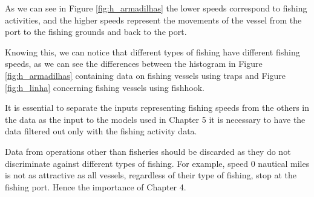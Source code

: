 As we can see in Figure \ref{fig:h_armadilhas} the lower speeds correspond to fishing activities, and the higher speeds represent the movements of the vessel from the port to the fishing grounds and back to the port.





Knowing this, we can notice that different types of fishing have different fishing speeds, as we can see the differences between the histogram in Figure \ref{fig:h_armadilhas} containing data on fishing vessels using traps and Figure \ref{fig:h_linha} concerning fishing vessels using fishhook.





It is essential to separate the inputs representing fishing speeds from the others in the data as the input to the models used in Chapter 5 it is necessary to have the data filtered out only with the fishing activity data.

Data from operations other than fisheries should be discarded as they do not discriminate against different types of fishing. For example, speed 0 nautical miles is not as attractive as all vessels, regardless of their type of fishing, stop at the fishing port.
Hence the importance of Chapter 4.







